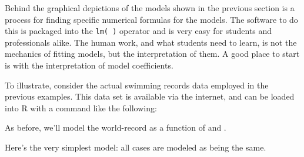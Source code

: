 Behind the graphical depictions of the models shown in the previous
section is a process for finding specific numerical formulas for the
models.  The software to do this is packaged into the \texttt{lm( )}
operator and is very easy for students and professionals alike.  The
human work, and what students need to learn, is not the mechanics of
fitting models, but the interpretation of them.  A good place to start
is with the interpretation of model coefficients.

To illustrate, consider the actual swimming records data employed in
the previous examples.  This data set is available via the internet,
and can be loaded into R with a command like the following:


\begin{knitrout}
\end{knitrout}





As before, we'll model the world-record  as a function of 
and .

Here's the very simplest model: all cases are modeled as being the same.
\begin{knitrout}
\end{knitrout}

